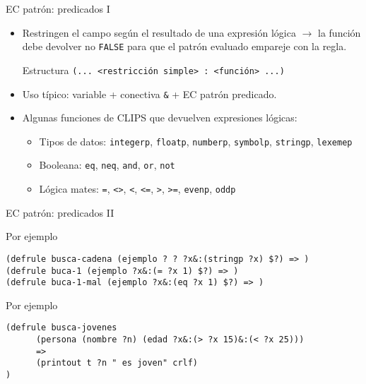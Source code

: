 \documentclass[usenames,dvipsnames,aspectratio=169]{beamer}
\begin{document}
\begin{frame}{EC patrón: predicados I}
	\begin{itemize}
		\item Restringen el campo según el resultado de una expresión lógica $\rightarrow$ la función debe devolver no \texttt{FALSE} para que el patrón evaluado empareje con la regla.
		\begin{block}{Estructura}
			\texttt{(... <restricción simple> : <función> ...)}
		\end{block}
		\item Uso típico: variable + conectiva \texttt{\&} + EC patrón predicado.
		\item Algunas funciones de CLIPS que devuelven expresiones lógicas:
		\begin{itemize}
			\item Tipos de datos: \texttt{integerp}, \texttt{floatp}, \texttt{numberp}, \texttt{symbolp}, \texttt{stringp}, \texttt{lexemep}
			\item Booleana: \texttt{eq}, \texttt{neq}, \texttt{and}, \texttt{or}, \texttt{not}
			\item Lógica mates: \texttt{=}, \texttt{<>}, \texttt{<}, \texttt{<=}, \texttt{>}, \texttt{>=}, \texttt{evenp}, \texttt{oddp}
		\end{itemize}
	\end{itemize}
\end{frame}

\begin{frame}[fragile]{EC patrón: predicados II}
	\begin{exampleblock}{Por ejemplo}
		\begin{verbatim}
(defrule busca-cadena (ejemplo ? ? ?x&:(stringp ?x) $?) => )
(defrule buca-1 (ejemplo ?x&:(= ?x 1) $?) => )
(defrule buca-1-mal (ejemplo ?x&:(eq ?x 1) $?) => )
		\end{verbatim}
	\end{exampleblock}
	\begin{exampleblock}{Por ejemplo}
		\begin{verbatim}
(defrule busca-jovenes
      (persona (nombre ?n) (edad ?x&:(> ?x 15)&:(< ?x 25)))
      =>
      (printout t ?n " es joven" crlf)
)
		\end{verbatim}
	\end{exampleblock}
\end{frame}
\end{document}
